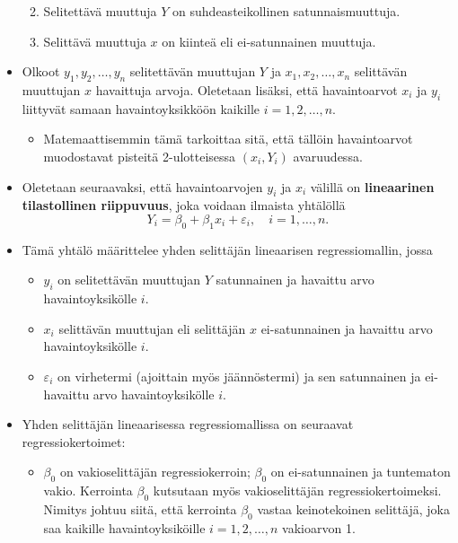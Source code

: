 \documentclass[
]{book}
\providecommand{\tightlist}{%
  \setlength{\itemsep}{0pt}\setlength{\parskip}{0pt}}
\begin{document}
\begin{itemize}
  \begin{enumerate}
  \def\labelenumi{\roman{enumi})}
  \tightlist
  \item
    Selitettävä muuttuja \(Y\) on suhdeasteikollinen satunnaismuuttuja.
  \item
    Selittävä muuttuja \(x\) on kiinteä eli ei-satunnainen muuttuja.
  \end{enumerate}
\item
  Olkoot \(y_1, y_2,\ldots, y_n\) selitettävän muuttujan \(Y\) ja \(x_1, x_2, \ldots, x_n\) selittävän muuttujan \(x\) havaittuja arvoja. Oletetaan lisäksi, että havaintoarvot \(x_i\) ja \(y_i\) liittyvät
  samaan havaintoyksikköön kaikille \(i=1, 2, \ldots, n\).

  \begin{itemize}
  \tightlist
  \item
    Matemaattisemmin tämä tarkoittaa sitä, että tällöin havaintoarvot muodostavat pisteitä 2-ulotteisessa \((x_i, Y_i)\) avaruudessa.
  \end{itemize}
\item
  Oletetaan seuraavaksi, että havaintoarvojen \(y_i\) ja \(x_i\) välillä on \textbf{lineaarinen tilastollinen riippuvuus}, joka voidaan ilmaista yhtälöllä
  \[
  Y_i = \beta_0 + \beta_1 x_i + \varepsilon_i, \quad i=1,\ldots, n.
  \]
\item
  Tämä yhtälö määrittelee yhden selittäjän lineaarisen regressiomallin, jossa

  \begin{itemize}
  \tightlist
  \item
    \(y_i\) on selitettävän muuttujan \(Y\) satunnainen ja havaittu arvo havaintoyksikölle \(i\).
  \item
    \(x_i\) selittävän muuttujan eli selittäjän \(x\) ei-satunnainen ja havaittu arvo havaintoyksikölle \(i\).
  \item
    \(\varepsilon_i\) on virhetermi (ajoittain myös jäännöstermi) ja sen satunnainen ja ei-havaittu arvo havaintoyksikölle \(i\).
  \end{itemize}
\item
  Yhden selittäjän lineaarisessa regressiomallissa on seuraavat regressiokertoimet:

  \begin{itemize}
  \tightlist
  \item
    \(\beta_0\) on vakioselittäjän regressiokerroin; \(\beta_0\) on ei-satunnainen ja tuntematon vakio. Kerrointa \(\beta_0\) kutsutaan myös vakioselittäjän regressiokertoimeksi. Nimitys johtuu siitä, että kerrointa \(\beta_0\) vastaa keinotekoinen selittäjä, joka saa kaikille havaintoyksiköille \(i=1, 2, \ldots, n\) vakioarvon 1.


\end{itemize}
\end{itemize}
\end{document}
